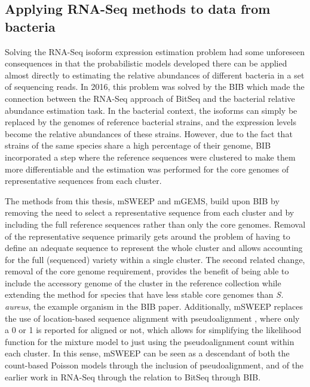 \documentclass[officiallayout]{tktla}
\begin{document}
\subsection{Applying RNA-Seq methods to data from bacteria}

Solving the RNA-Seq isoform expression estimation problem had some
unforeseen consequences in that the probabilistic models developed
there can be applied almost directly to estimating the relative
abundances of different bacteria in a set of sequencing reads. In
2016, this problem was solved by the BIB \citep{sankar2016bayesian}
which made the connection between the RNA-Seq approach of BitSeq and
the bacterial relative abundance estimation task. In the bacterial
context, the isoforms can simply be replaced by the genomes of
reference bacterial strains, and the expression levels become the
relative abundances of these strains. However, due to the fact that
strains of the same species share a high percentage of their genome,
BIB incorporated a step where the reference sequences were clustered
to make them more differentiable and the estimation was performed for
the core genomes of representative sequences from each cluster.

The methods from this thesis, mSWEEP and mGEMS, build upon BIB by
removing the need to select a representative sequence from each
cluster and by including the full reference sequences rather than only
the core genomes. Removal of the representative sequence primarily
gets around the problem of having to define an adequate sequence to
represent the whole cluster and allows accounting for the full
(sequenced) variety within a single cluster. The second related
change, removal of the core genome requirement, provides the benefit
of being able to include the accessory genome of the cluster in the
reference collection while extending the method for species that have
less stable core genomes than \textit{S. aureus}, the example organism
in the BIB paper. Additionally, mSWEEP replaces the use of
location-based sequence alignment with pseudoalignment
\citep{bray2016near}, where only a 0 or 1 is reported for aligned or
not, which allows for simplifying the likelihood function for the
mixture model to just using the pseudoalignment count within each
cluster. In this sense, mSWEEP can be seen as a descendant of both the
count-based Poisson models \citep{jiang2009statistical,
  wang2010isoform} through the inclusion of pseudoalignment, and of
the earlier work in RNA-Seq through the relation to BitSeq through
BIB.
\end{document}
